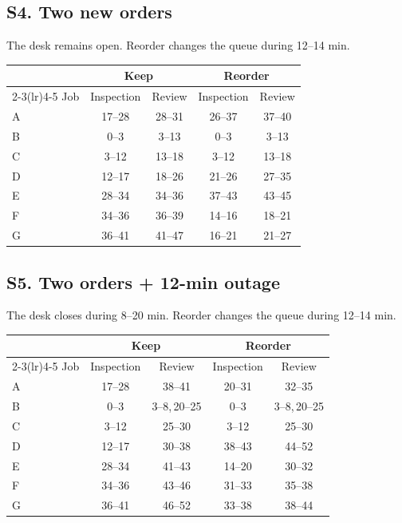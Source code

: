 {\subsection*{S4. Two new orders}
The desk remains open. Reorder changes the queue during 12--14 min.\par
\begin{center}\small
\begingroup\setlength{\tabcolsep}{5pt}
\begin{tabular}{@{}lcccc@{}}
\toprule
 & \multicolumn{2}{c}{Keep} & \multicolumn{2}{c}{Reorder} \\
\cmidrule(lr){2-3}\cmidrule(lr){4-5}
Job & Inspection & Review & Inspection & Review \\
\midrule
A & 17--28 & 28--31 & 26--37 & 37--40 \\
B & 0--3 & 3--13 & 0--3 & 3--13 \\
C & 3--12 & 13--18 & 3--12 & 13--18 \\
D & 12--17 & 18--26 & 21--26 & 27--35 \\
E & 28--34 & 34--36 & 37--43 & 43--45 \\
F & 34--36 & 36--39 & 14--16 & 18--21 \\
G & 36--41 & 41--47 & 16--21 & 21--27 \\
\bottomrule
\end{tabular}\endgroup
\end{center}
\subsection*{S5. Two orders + 12-min outage}
The desk closes during 8--20 min. Reorder changes the queue during 12--14 min.\par
\begin{center}\small
\begingroup\setlength{\tabcolsep}{5pt}
\begin{tabular}{@{}lcccc@{}}
\toprule
 & \multicolumn{2}{c}{Keep} & \multicolumn{2}{c}{Reorder} \\
\cmidrule(lr){2-3}\cmidrule(lr){4-5}
Job & Inspection & Review & Inspection & Review \\
\midrule
A & 17--28 & 38--41 & 20--31 & 32--35 \\
B & 0--3 & 3--8,\,20--25 & 0--3 & 3--8,\,20--25 \\
C & 3--12 & 25--30 & 3--12 & 25--30 \\
D & 12--17 & 30--38 & 38--43 & 44--52 \\
E & 28--34 & 41--43 & 14--20 & 30--32 \\
F & 34--36 & 43--46 & 31--33 & 35--38 \\
G & 36--41 & 46--52 & 33--38 & 38--44 \\
\bottomrule
\end{tabular}\endgroup
\end{center}%
}

